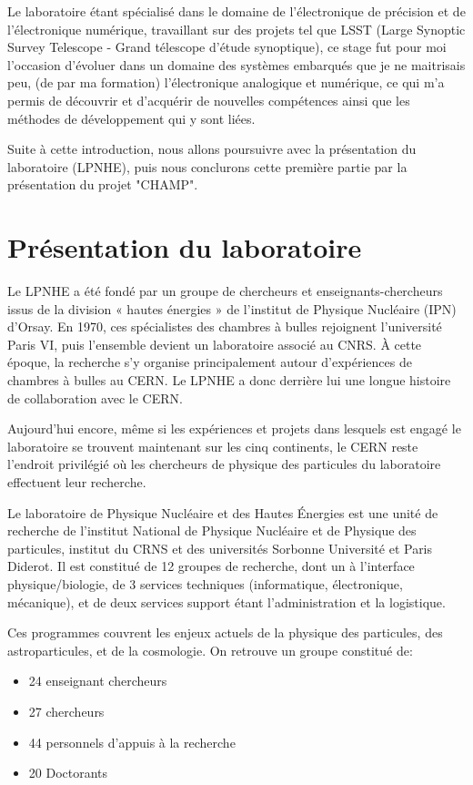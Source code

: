 \documentclass[french,a4paper,12pt]{report}
\begin{document}
Le laboratoire étant spécialisé dans le domaine de l'électronique de précision et de l'électronique numérique, travaillant sur des projets tel que LSST (Large Synoptic Survey Telescope - Grand télescope d'étude synoptique), ce stage fut pour moi l'occasion d'évoluer dans un domaine des systèmes embarqués que je ne maitrisais peu, (de par ma formation) l'électronique analogique et numérique, ce qui m'a permis de découvrir et d'acquérir de nouvelles compétences ainsi que les méthodes de développement qui y sont liées.

Suite à cette introduction, nous allons poursuivre avec la présentation du laboratoire (LPNHE), puis nous conclurons cette première partie par la présentation du projet "CHAMP".


  
	\chapter{Présentation du laboratoire}
  Le LPNHE a été fondé par un groupe de chercheurs et enseignants-chercheurs issus de la division « hautes énergies » de l’institut de Physique Nucléaire (IPN) d’Orsay. En 1970, ces spécialistes des chambres à bulles rejoignent l’université Paris VI, puis l’ensemble devient un laboratoire associé au CNRS. À cette époque, la recherche s’y organise principalement autour d’expériences de chambres à bulles au CERN. Le LPNHE a donc derrière lui une longue histoire de collaboration avec le CERN.
  
  Aujourd’hui encore, même si les expériences et projets dans lesquels est engagé le laboratoire se trouvent maintenant sur les cinq continents, le CERN reste l’endroit privilégié où les chercheurs de physique des particules du laboratoire effectuent leur recherche.
  
  Le laboratoire de Physique Nucléaire et des Hautes Énergies est une unité de recherche de l'institut National de Physique Nucléaire et de Physique des particules, institut du CRNS et des universités Sorbonne Université et Paris Diderot. Il est constitué de 12 groupes de recherche, dont un à l’interface physique/biologie, de 3 services techniques (informatique, électronique, mécanique), et de deux services support étant l'administration et la logistique.
  
  Ces programmes couvrent les enjeux actuels de la physique des particules, des astroparticules, et de la cosmologie.
  On retrouve un groupe constitué de:
  \begin{itemize}
  \item  24 enseignant chercheurs
  \item  27 chercheurs
  \item  44 personnels d'appuis à la recherche
  \item  20 Doctorants
  \end{itemize}
  \newpage
  
\end{document}
